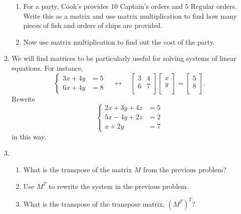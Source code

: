 \documentclass[../gatm.tex]{subfiles}
\begin{document}
\begin{enumerate}
\begin{enumerate}
\item For a party, Cook's provides $10$ Captain's orders and $5$ Regular orders. Write this as a matrix and use matrix multiplication to find how many pieces of fish and orders of chips are provided.
\item Now use matrix multiplication to find out the cost of the party.
\end{enumerate}
\item We will find matrices to be particularly useful for solving systems of linear equations. For instance, $$\begin{cases}3x+4y&=5 \\ 6x+4y &= 8\end{cases}\quad\longleftrightarrow\quad\left[\begin{array}{cc} 3 & 4 \\ 6 & 7 \\ \end{array}\right]\left[\begin{array}{c} x \\ y \\ \end{array}\right]=\left[\begin{array}{c} 5 \\ 8 \\ \end{array}\right].$$ Rewrite $$\begin{cases}2x+3y+4z&=5 \\ 5x-4y+2z &= 2 \\ x+2y &= 7\end{cases}$$ in this way.
\item \begin{enumerate}
\item What is the transpose of the matrix $M$ from the previous problem?
\item Use $M^T$ to rewrite the system in the previous problem.
\item What is the transpose of the transpose matrix, $(M^T)^T$?
\end{enumerate}
\end{enumerate}
\end{document}
